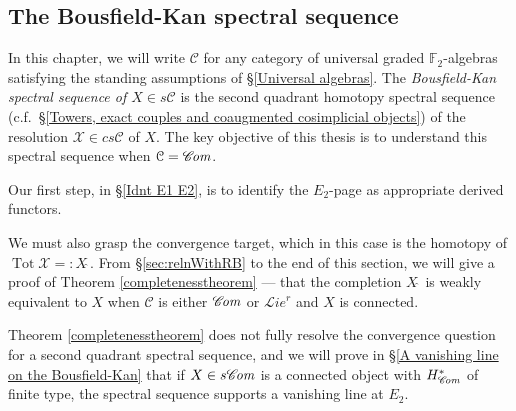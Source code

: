 \documentclass[11pt]{amsart} \renewcommand{\baselinestretch}{1.2}
\theoremstyle{plain}
\numberwithin{equation}{section} %
\theoremstyle{plain}
\numberwithin{equation}{chapter} %
\DeclareMathOperator{\Tot}{Tot}
\newcommand{\scrL}{\mathscr{L}}
\newcommand{\scrC}{\mathscr{C}}
\newcommand{\calC}{\mathcal{C}}
\newcommand{\calx}{\mathcal{X}}
\newcommand{\calc}{\mathcal{C}}
\newcommand{\F}{\mathbb{F}}
\newcommand{\algs}{{\scrC\!\textit{\normalfont\textit{om}}}}
\newcommand{\restliealgs}{{\scrL\!\textit{ie}^\textit{r}}}
\newcommand{\algcat}{{\calc}}%
\newcommand{\Ftwo}{\F_2}
\newcommand{\SectionOrChapter}[1]{\section{\textbf{#1}}}
\begin{document}
\begin{Bousfield-Kan spectral sequence}
\SectionOrChapter{The Bousfield-Kan spectral sequence}
\label{Bousfield-Kan spectral sequence}

In this chapter, we will write $\algcat$ for any category of universal graded $\Ftwo $-algebras satisfying the standing assumptions of \S\ref{Universal algebras}. The \emph{Bousfield-Kan spectral sequence of $X\in s\algcat$} is the second quadrant homotopy spectral sequence (c.f.\ \S\ref{Towers, exact couples and coaugmented cosimplicial objects}) of the resolution $\calx\in cs\algcat$ of $X$.
The key objective of this thesis is to understand this spectral sequence when $\calc=\algs$.

Our first step, in \S\ref{Idnt E1 E2}, is to identify the $E_2$-page as appropriate derived functors.

We must also grasp the convergence target, which in this case is the homotopy of $\Tot \calx=:X\hat{\ }$. From \S\ref{sec:relnWithRB} to the end of this section, we will give a proof of Theorem \ref{completenesstheorem} --- that the completion $X\hat{\ } $ is weakly equivalent to $X$ when $\calC$ is either $\algs$ or $\restliealgs$ and $X$ is connected.

Theorem \ref{completenesstheorem} does not fully resolve the convergence question for a second quadrant spectral sequence, and we will prove in \S\ref{A vanishing line on the Bousfield-Kan} that if $X\in s\algs$ is a connected object with $H^*_\algs$ of finite type, the spectral sequence supports a vanishing line at $E_2$.





\end{Bousfield-Kan spectral sequence}
\end{document}
